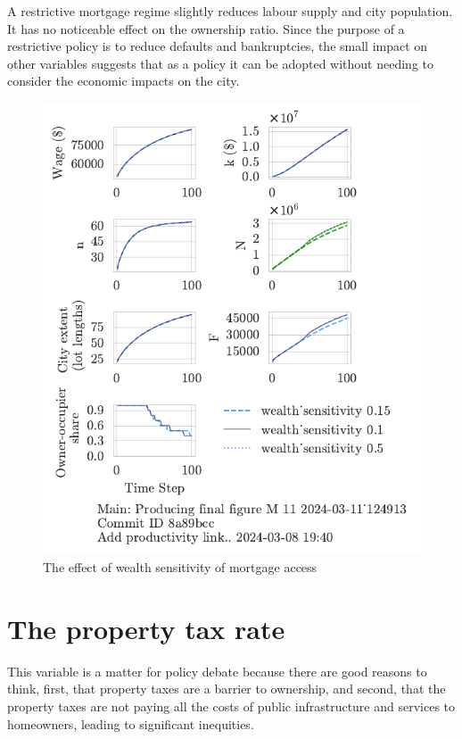 A restrictive mortgage regime slightly reduces labour supply and city population. It has no noticeable effect on the ownership ratio. Since the purpose of a restrictive policy is to reduce defaults and bankruptcies, the small impact on other variables suggests that as a policy it can be adopted without needing to consider the  economic impacts on the city. 

\begin{figure}[h!bt]
    \centering
    \includegraphics[scale=.8, trim={0 1.4cm 0 0},clip]{fig/wealth_sensitivity-124913.pdf}
    \caption{The effect of wealth sensitivity of mortgage access}
    \label{fig:wealth_sensitivity_ownership_trajectory}
\end{figure}

\newpage

\section{The property tax rate}

This variable is a matter for policy debate because there are good reasons to think, first, that property taxes are a barrier to ownership, and second, that the property taxes are not paying all the costs of public infrastructure and services to homeowners, leading to significant inequities.

